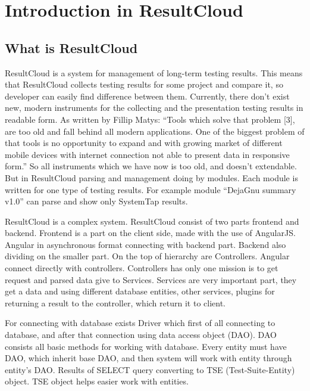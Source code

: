 
\chapter{Introduction in ResultCloud}
\section{What is ResultCloud}

ResultCloud is a system for management of long-term testing results. This means that ResultCloud collects testing results for some project and compare it, so developer can easily find difference between them. Currently, there don't exist new, modern instruments for the collecting and the presentation testing results in readable form. As written by Fillip Matys: “Tools which solve that problem [3], are too old and fall behind all modern applications. One of the biggest problem of that tools is no opportunity to expand and with growing market of different mobile devices with internet connection not able to present data in responsive form.” So all instruments which we have now is too old, and doesn't extendable. But in ResultCloud parsing and management doing by modules. Each module is written for one type of testing results. For example module “DejaGnu summary v1.0” can parse and show only SystemTap results. 

ResultCloud is a complex system. ResultCloud consist of two parts frontend and backend. Frontend is a part on the client side, made with the use of AngularJS. Angular in asynchronous format connecting with backend part. Backend also dividing on the smaller part. On the top of hierarchy are Controllers. Angular connect directly with controllers. Controllers has only one mission is to get request and parsed data give to Services. Services are very important part, they get a data and using different database entities, other services, plugins for returning a result to the controller, which return it to client. 

For connecting with database exists Driver which first of all connecting to database, and after that connection using data access object (DAO). DAO consists all basic methods for working with database. Every entity must have DAO, which inherit base DAO, and then system will work with entity through entity's DAO. Results of SELECT query converting to TSE (Test-Suite-Entity) object. TSE object helps easier work with entities.


